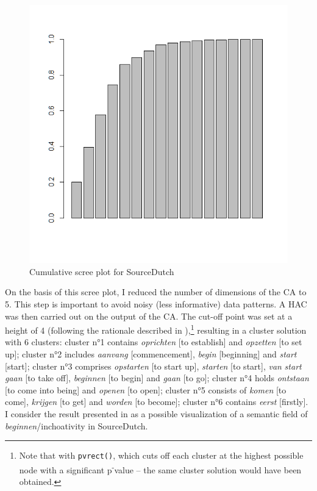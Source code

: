 \begin{figure}
\includegraphics[height=.4\textheight]{figures/Vandevoorde2-img51.png}
\caption{\label{fig:4:51}  Cumulative scree plot for SourceDutch}
\end{figure}

On the basis of this scree plot, I reduced the number of dimensions of the CA to 5. This step is important to avoid noisy (less informative) data patterns. A HAC was then carried out on the output of the CA. The cut-off point was set at a height of 4 (following the rationale described in ),\footnote{Note that with \texttt{pvrect()}, which cuts off each cluster at the highest possible node with a significant p\textsuperscript{{}-}value – the same cluster solution would have been obtained.} resulting in a cluster solution with 6 clusters: cluster n°1 contains \textit{oprichten} [to establish] and \textit{opzetten} [to set up]; cluster n°2 includes \textit{aanvang} [commencement], \textit{begin} [beginning] and \textit{start} [start]; cluster n°3 comprises \textit{opstarten} [to start up], \textit{starten} [to start], \textit{van} \textit{start} \textit{gaan} [to take off], \textit{beginnen} [to begin] and \textit{gaan} [to go]; cluster n°4 holds \textit{ontstaan} [to come into being] and \textit{openen} [to open]; cluster n°5 consists of \textit{komen} [to come], \textit{krijgen} [to get] and \textit{worden} [to become]; cluster n°6 contains \textit{eerst} [firstly]. I consider the result presented in  as a possible visualization of a semantic field of \textit{beginnen}/inchoativity in SourceDutch.

